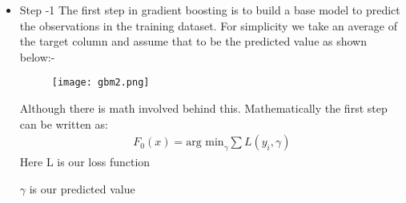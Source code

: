 \documentclass[a4paper, 11pt]{article}
\begin{document}
    \begin{itemize}
        \item Step -1 The first step in gradient boosting is to build a base model to predict the observations in the training dataset.
        For simplicity we take an average of the target column and assume that to be the predicted value as shown below:-

        \begin{figure}[h!]
            \centering
            \texttt{[image: gbm2.png]}
            \label{fig:fig2}
          \end{figure}

         Although there is math involved behind this. Mathematically the first step can be written as:
         \begin{align}
            F_0(x) = \text{arg min}_\gamma \sum L(y_i,\gamma)
         \end{align}
         Here L is our loss function

         $\gamma$ is our predicted value
         

\end{itemize}
\end{document}
